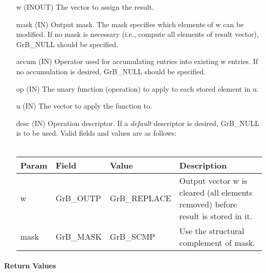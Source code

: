 \begin{itemize}[leftmargin=1.1in]
    \item[{\sf w}]     ({\sf INOUT}) The vector to assign the result.

    \item[{\sf mask}]  ({\sf IN}) Output mask. The mask
    specifies which elements of {\sf w} can be modified.
    If no mask is necessary (i.e., compute all elements of result
    vector), {\sf GrB\_NULL} should be specified.

    \item[{\sf accum}] ({\sf IN}) Operator used for accumulating entries into existing {\sf w} entries. 
			If no accumulation is desired, {\sf GrB\_NULL} should be specified.

    \item[{\sf op}]    ({\sf IN}) The unary function (operation) to apply to each stored element in {\sf u}.
    \item[{\sf u}]     ({\sf IN}) The vector to apply the function to.
    \item[{\sf desc}]  ({\sf IN}) Operation descriptor. If a
    \emph{default} descriptor is desired, {\sf GrB\_NULL} is to be
    used.  Valid fields and values are as follows: \\ ~\\
    \begin{tabular}{lllp{2.5in}}
    Param & Field  & Value & Description \\
    \hline
    {\sf w}    & {\sf GrB\_OUTP} & {\sf GrB\_REPLACE} & Output vector {\sf w} is cleared (all elements removed) before result is stored in it. \\
    {\sf mask} & {\sf GrB\_MASK} & {\sf GrB\_SCMP}   & Use the structural complement of {\sf mask}. \\
    \end{tabular}
\end{itemize}

\paragraph{Return Values}

